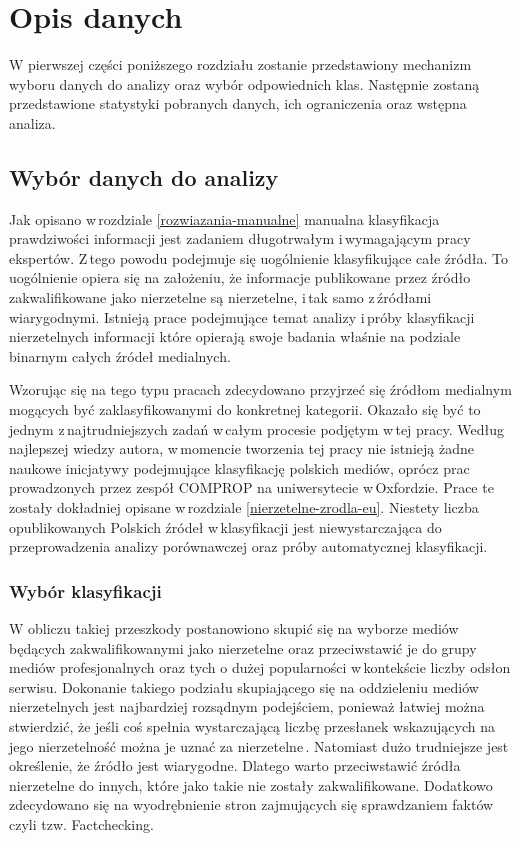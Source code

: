 \newpage
\section{Opis danych}
W pierwszej części poniższego rozdziału zostanie przedstawiony mechanizm wyboru danych do analizy oraz wybór odpowiednich klas. Następnie zostaną przedstawione statystyki pobranych danych, ich ograniczenia oraz wstępna analiza. 
\subsection{Wybór danych do analizy} \label{wybor-danych}
 Jak opisano w\,rozdziale \ref{rozwiazania-manualne} manualna klasyfikacja prawdziwości informacji jest zadaniem długotrwałym i\,wymagającym pracy ekspertów. Z\,tego powodu podejmuje się uogólnienie klasyfikujące całe źródła. To uogólnienie opiera się na założeniu, że informacje publikowane przez źródło zakwalifikowane jako nierzetelne są nierzetelne, i\,tak samo z\,źródłami wiarygodnymi. Istnieją prace podejmujące temat analizy i\,próby klasyfikacji nierzetelnych informacji które opierają swoje badania właśnie na podziale binarnym całych źródeł medialnych\cite{marchal2019junk}\cite{tacchini2017some}.
\par
Wzorując się na tego typu pracach zdecydowano przyjrzeć się źródłom medialnym mogących być zaklasyfikowanymi do konkretnej kategorii. Okazało się być to jednym z\,najtrudniejszych zadań w\,całym procesie podjętym w\,tej pracy. Według najlepszej wiedzy autora, w\,momencie tworzenia tej pracy nie istnieją żadne naukowe inicjatywy podejmujące klasyfikację polskich mediów, oprócz prac prowadzonych przez zespół COMPROP na uniwersytecie w\,Oxfordzie. Prace te zostały dokładniej opisane w\,rozdziale \ref{nierzetelne-zrodla-eu}. Niestety liczba opublikowanych Polskich źródeł w\,klasyfikacji jest niewystarczająca do przeprowadzenia analizy porównawczej oraz próby automatycznej klasyfikacji. 
\subsubsection{Wybór klasyfikacji}
W obliczu takiej przeszkody postanowiono skupić się na wyborze mediów będących zakwalifikowanymi jako nierzetelne oraz przeciwstawić je do grupy mediów profesjonalnych oraz tych o dużej popularności w\,kontekście liczby odsłon serwisu. Dokonanie takiego podziału skupiającego się na oddzieleniu mediów nierzetelnych jest najbardziej rozsądnym podejściem, ponieważ łatwiej można stwierdzić, że jeśli coś spełnia wystarczającą liczbę przesłanek wskazujących na jego nierzetelność można je uznać za nierzetelne\,\cite{shu2017fake}. Natomiast dużo trudniejsze jest określenie, że źródło jest wiarygodne. Dlatego warto przeciwstawić źródła nierzetelne do innych, które jako takie nie zostały zakwalifikowane. Dodatkowo zdecydowano się na wyodrębnienie stron zajmujących się sprawdzaniem faktów czyli tzw. Factchecking.
